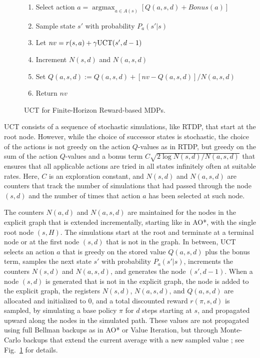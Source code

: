 \documentclass[letterpaper]{article}
\DeclareMathOperator*{\argmax}{argmax}
\begin{document}
\begin{figure}[t]
{{\begin{minipage}{3.9in}
\begin{enumerate}[1.]
\begin{enumerate}[--]
      \item Select action $a = \argmax_{a\in A(s)} [Q(a,s,d) + Bonus(a)]$
      \item Sample state $s'$ with probability $P_{a}(s'|s)$
      \item Let $nv =r(s,a) + \gamma \hbox{UCT}(s',d-1)$
      \item Increment $N(s,d)$ and $N(a,s,d)$
      \item Set $Q(a,s,d):=Q(a,s,d) + [nv - Q(a,s,d)] / N(a,s,d)$
      \item Return $nv$
      \end{enumerate}
    \end{enumerate}
  \end{minipage}}
}
\caption{UCT for Finite-Horizon Reward-based MDPs.}
\label{fig:uct}
\end{figure}

UCT consists of a sequence of stochastic simulations, like RTDP, that start
at the root node. However, while the choice of successor states is stochastic,
the choice of the actions %
is not greedy on the action
$Q$-values as in RTDP, but greedy on the sum of the action $Q$-values and a
bonus term $C\sqrt{2\log N(s,d)/N(a,s,d)}$ that ensures that all applicable
actions are tried in all states infinitely often at suitable rates.
Here, $C$ is an exploration constant, and $N(s,d)$ and $N(a,s,d)$ are counters
that track the number of simulations that had passed through
the node $(s,d)$ and the number of times that action $a$ has been selected
at such node.

The counters $N(a,d)$ and $N(a,s,d)$ are maintained for the  nodes in the explicit graph
that is extended incrementally, starting like in   AO*, with the  single root node $(s,H)$.
The  simulations start  at the root and terminate at a terminal node or at the first node $(s,d)$
that is not in the graph. In between, UCT selects an action $a$ that is greedy on the stored value $Q(a,s,d)$ plus the bonus term,
samples the  next state $s'$ with probability $P_a(s'|s)$, increments the counters $N(s,d)$ and
$N(a,s,d)$, and generates the node $(s',d-1)$. When a node $(s,d)$ is generated that is not in
the explicit graph, the node is added to the explicit graph,  the registers $N(s,d)$, $N(a,s,d)$,
and $Q(a,s,d)$ are allocated and initialized to $0$, and a total discounted reward $r(\pi,s,d)$ is sampled,
by simulating a base policy $\pi$ for $d$ steps starting at $s$, and  %
propagated upward along the nodes in the simulated path. These values
are not propagated using full Bellman backups as in AO* or Value Iteration,
but through Monte-Carlo backups that extend the current average with
a new sampled value \cite{sutton:book}; see Fig.~\ref{fig:uct} for details.
\end{document}
